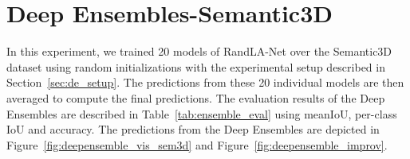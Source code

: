     \section{Deep Ensembles-Semantic3D}
    \label{sec:deepensemble_train}
    In this experiment, we trained 20 models of RandLA-Net over the Semantic3D dataset using random initializations with the experimental setup described in Section~\ref{sec:de_setup}.
    The predictions from these 20 individual models are then averaged to compute the final predictions.
    The evaluation results of the Deep Ensembles are described in Table~\ref{tab:ensemble_eval} using meanIoU, per-class IoU and accuracy.
    The predictions from the Deep Ensembles are depicted in Figure~\ref{fig:deepensemble_vis_sem3d} and Figure~\ref{fig:deepensemble_improv}.
    \begin{table}[h!]
        \caption{Illustration of performance of RandLA-Net on Semantic3D over ensemble size. meanIOU, IOU per-class and overall accuracy are represented here.
        C1 to C8 are the classes of Semantic3D which are Manmadeterrain, Naturalterrain, Highvegetation, Lowvegetation, Buildings, Hardscapes, Scanningartifacts, and Cars.}
        \label{tab:ensemble_eval}
    \end{table} 

